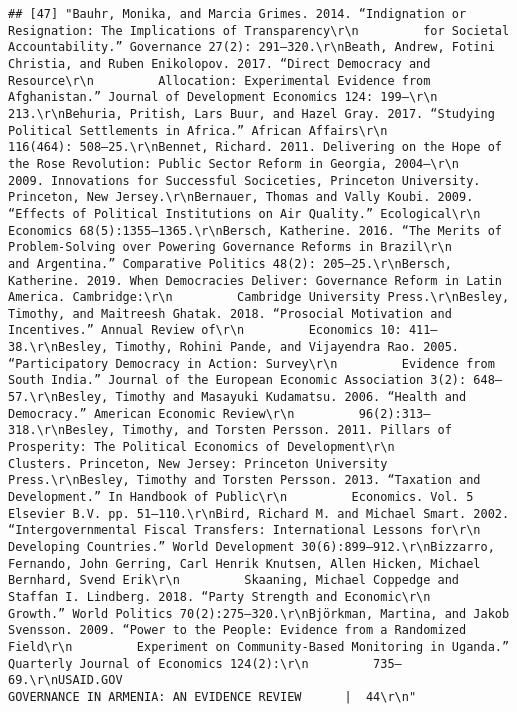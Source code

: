 \documentclass[
]{article}
\begin{document}
\begin{verbatim}
## [47] "Bauhr, Monika, and Marcia Grimes. 2014. “Indignation or Resignation: The Implications of Transparency\r\n         for Societal Accountability.” Governance 27(2): 291–320.\r\nBeath, Andrew, Fotini Christia, and Ruben Enikolopov. 2017. “Direct Democracy and Resource\r\n         Allocation: Experimental Evidence from Afghanistan.” Journal of Development Economics 124: 199–\r\n         213.\r\nBehuria, Pritish, Lars Buur, and Hazel Gray. 2017. “Studying Political Settlements in Africa.” African Affairs\r\n         116(464): 508–25.\r\nBennet, Richard. 2011. Delivering on the Hope of the Rose Revolution: Public Sector Reform in Georgia, 2004–\r\n         2009. Innovations for Successful Sociceties, Princeton University. Princeton, New Jersey.\r\nBernauer, Thomas and Vally Koubi. 2009. “Effects of Political Institutions on Air Quality.” Ecological\r\n         Economics 68(5):1355–1365.\r\nBersch, Katherine. 2016. “The Merits of Problem-Solving over Powering Governance Reforms in Brazil\r\n         and Argentina.” Comparative Politics 48(2): 205–25.\r\nBersch, Katherine. 2019. When Democracies Deliver: Governance Reform in Latin America. Cambridge:\r\n         Cambridge University Press.\r\nBesley, Timothy, and Maitreesh Ghatak. 2018. “Prosocial Motivation and Incentives.” Annual Review of\r\n         Economics 10: 411–38.\r\nBesley, Timothy, Rohini Pande, and Vijayendra Rao. 2005. “Participatory Democracy in Action: Survey\r\n         Evidence from South India.” Journal of the European Economic Association 3(2): 648–57.\r\nBesley, Timothy and Masayuki Kudamatsu. 2006. “Health and Democracy.” American Economic Review\r\n         96(2):313–318.\r\nBesley, Timothy, and Torsten Persson. 2011. Pillars of Prosperity: The Political Economics of Development\r\n         Clusters. Princeton, New Jersey: Princeton University Press.\r\nBesley, Timothy and Torsten Persson. 2013. “Taxation and Development.” In Handbook of Public\r\n         Economics. Vol. 5 Elsevier B.V. pp. 51–110.\r\nBird, Richard M. and Michael Smart. 2002. “Intergovernmental Fiscal Transfers: International Lessons for\r\n         Developing Countries.” World Development 30(6):899–912.\r\nBizzarro, Fernando, John Gerring, Carl Henrik Knutsen, Allen Hicken, Michael Bernhard, Svend Erik\r\n         Skaaning, Michael Coppedge and Staffan I. Lindberg. 2018. “Party Strength and Economic\r\n         Growth.” World Politics 70(2):275–320.\r\nBjörkman, Martina, and Jakob Svensson. 2009. “Power to the People: Evidence from a Randomized Field\r\n         Experiment on Community-Based Monitoring in Uganda.” Quarterly Journal of Economics 124(2):\r\n         735–69.\r\nUSAID.GOV                                                 GOVERNANCE IN ARMENIA: AN EVIDENCE REVIEW      |  44\r\n"                                                                                                                                                                                                                                                                                                                                                                                                                                                                                                                                                           
\end{verbatim}
\end{document}
